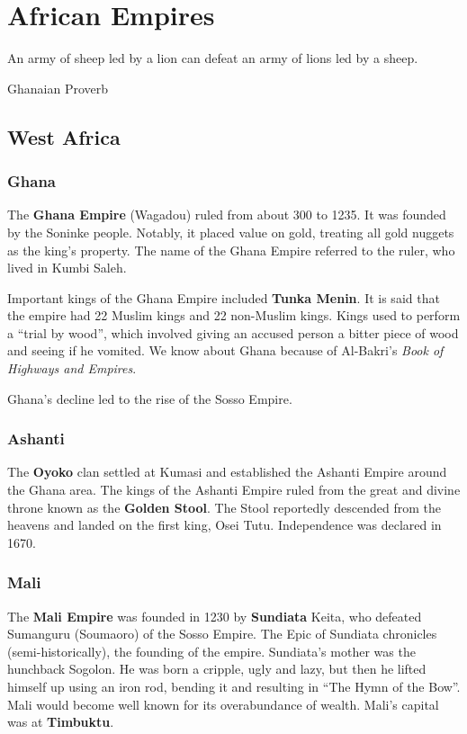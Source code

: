 \chapter{African Empires}

\epigraph{%
  An army of sheep led by a lion can defeat an army of lions led by a sheep.
}{Ghanaian Proverb}

\section{West Africa}

\subsection*{Ghana}

The \textbf{Ghana Empire} (Wagadou) ruled from about 300 to 1235.
It was founded by the Soninke people.
Notably, it placed value on gold, treating all gold nuggets as the king's property.
The name of the Ghana Empire referred to the ruler, who lived in Kumbi Saleh.

Important kings of the Ghana Empire included \textbf{Tunka Menin}.
It is said that the empire had 22 Muslim kings and 22 non-Muslim kings.
Kings used to perform a ``trial by wood'',
which involved giving an accused person a bitter piece of wood and seeing if he vomited.
We know about Ghana because of Al-Bakri's \textit{Book of Highways and Empires}.

Ghana's decline led to the rise of the Sosso Empire.

\subsection*{Ashanti}

The \textbf{Oyoko} clan settled at Kumasi and established the Ashanti Empire around the Ghana area.
The kings of the Ashanti Empire ruled from the great and divine throne known as the \textbf{Golden Stool}.
The Stool reportedly descended from the heavens and landed on the first king, Osei Tutu.
Independence was declared in 1670.

\subsection*{Mali}

The \textbf{Mali Empire} was founded in 1230 by \textbf{Sundiata} Keita,
who defeated Sumanguru (Soumaoro) of the Sosso Empire.
The Epic of Sundiata chronicles (semi-historically), the founding of the empire.
Sundiata's mother was the hunchback Sogolon.
He was born a cripple, ugly and lazy,
but then he lifted himself up using an iron rod, bending it and resulting in ``The Hymn of the Bow''.
Mali would become well known for its overabundance of wealth.
Mali's capital was at \textbf{Timbuktu}.

